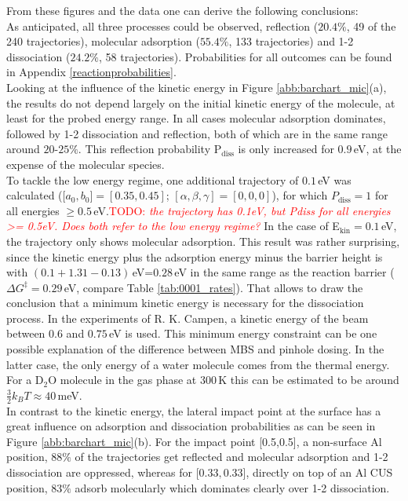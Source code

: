 \documentclass[11pt,DIV=13,BCOR=5mm,a4paper,headinclude]{scrbook}
\newcommand\todo[1]{\textcolor{red}{TODO: \textit{{#1}}}}
\begin{document}
From these figures and the data one can derive the following conclusions:
\\
As anticipated, all three processes could be observed, reflection ($20.4\%$, 49 of the 240 trajectories), molecular adsorption ($55.4\%$, 133 trajectories) and 1-2 dissociation ($24.2\%$, 58 trajectories).
Probabilities for all outcomes can be found in Appendix \ref{reactionprobabilities}.
\\
Looking at the influence of the kinetic energy in Figure \ref{abb:barchart_mic}(a), the results do not depend largely on the initial kinetic energy of the molecule, at least for the probed energy range.
In all cases molecular adsorption dominates, followed by 1-2 dissociation and reflection, both of which are in the same range around $20$-$25\%$.
This reflection probability P$_\textrm{diss}$ is only increased for $0.9\,$eV, at the expense of the molecular species.\\
To tackle the low energy regime, one additional trajectory of $0.1\,$eV was calculated ([$a_0,b_0]=[0.35,0.45]$; $[\alpha,\beta,\gamma]=[0,0,0]$), for which $P_\textrm{diss}=1$ for all energies $\geq 0.5\,$eV.\todo{the trajectory has 0.1eV, but Pdiss for all energies >= 0.5eV. Does both refer to the low energy regime?}
In the case of E$_\textrm{kin}=0.1\,$eV, the trajectory only shows molecular adsorption.
This result was rather surprising, since the kinetic energy plus the adsorption energy minus the barrier height is with $(0.1+1.31-0.13)\,$eV=$0.28\,$eV in the same range as the reaction barrier ($\Delta G^\ddagger=0.29\,$eV, compare Table \ref{tab:0001_rates}).
That allows to draw the conclusion that a minimum kinetic energy is necessary for the dissociation process.
In the experiments of R. K. Campen, a kinetic energy of the beam between $0.6$ and $0.75\,$eV is used.
This minimum energy constraint can be one possible explanation of the difference between MBS and pinhole dosing.
In the latter case, the only energy of a water molecule comes from the thermal energy.
For a D$_2$O molecule in the gas phase at $300\,$K this can be estimated to be around $\frac{3}{2}k_BT\approx40\,$meV.
\\
In contrast to the kinetic energy, the lateral impact point at the surface has a great influence on adsorption and dissociation probabilities as can be seen in Figure \ref{abb:barchart_mic}(b).
For the impact point [0.5,0.5], a non-surface Al position, $88\%$ of the trajectories get reflected and molecular adsorption and 1-2 dissociation are oppressed, whereas for [$0.33,0.33$], directly on top of an Al CUS position, $83\%$ adsorb molecularly which dominates clearly over 1-2 dissociation.
\end{document}
